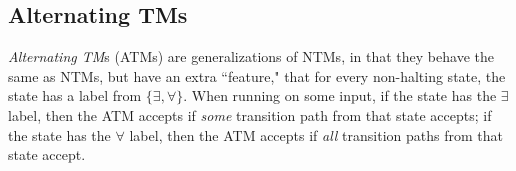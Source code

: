 




\subsection{Alternating TMs}
\begin{definition}
\emph{Alternating TM}s (ATMs) are generalizations of NTMs, in that they behave the same as NTMs, but have an extra ``feature," that for every non-halting state, the state has a label from $\{\exists, \forall\}$. When running on some input, if the state has the $\exists$ label, then the ATM accepts if \emph{some} transition path from that state accepts; if the state has the $\forall$ label, then the ATM accepts if \emph{all} transition paths from that state accept.
\end{definition}